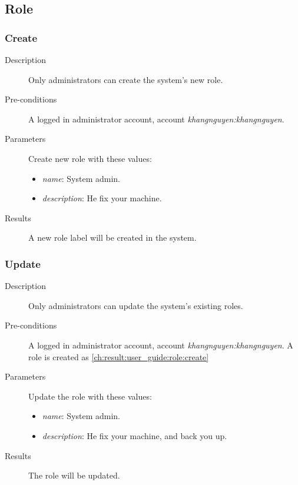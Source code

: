 \subsection{Role}
\label{ch:result:user_guide:role}
\subsubsection{Create}
\label{ch:result:user_guide:role:create}

\begin{description}
\item[Description] Only administrators can create the system's new role.
\item[Pre-conditions] A logged in administrator account, \eg account \emph{khangnguyen:khangnguyen}.
\item[Parameters] Create new role with these values:
\begin{itemize}
\item \emph{name}: System admin.
\item \emph{description}: He fix your machine.
\end{itemize}
\item[Results] A new role label will be created in the system.
\end{description}

\subsubsection{Update}
\label{ch:result:user_guide:role:update}

\begin{description}
\item[Description] Only administrators can update the system's existing roles.
\item[Pre-conditions] A logged in administrator account, \eg account \emph{khangnguyen:khangnguyen}.
A role is created as \autoref{ch:result:user_guide:role:create}
\item[Parameters] Update the role with these values:
\begin{itemize}
\item \emph{name}: System admin.
\item \emph{description}: He fix your machine, and back you up.
\end{itemize}
\item[Results] The role will be updated.
\end{description}


